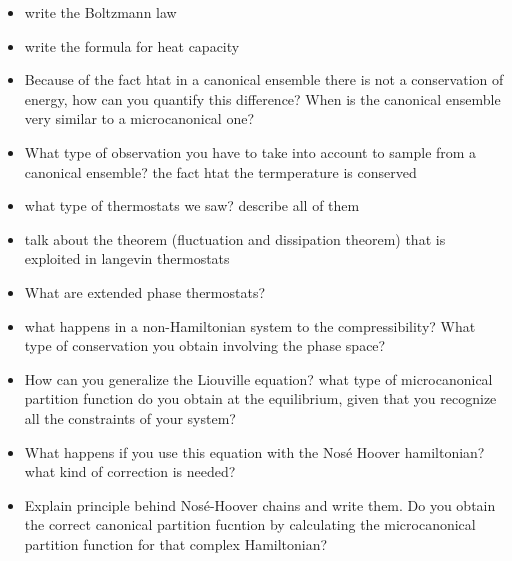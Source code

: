 \begin{enumerate}
\begin{itemize}
        \item write the Boltzmann law
        \item write the formula for heat capacity
        \item Because of the fact htat in a canonical ensemble there is not a conservation of energy, how can you quantify this difference? When is the canonical ensemble very similar to a microcanonical one?
        \item What type of observation you have to take into account to sample from a canonical ensemble? the fact htat the termperature is conserved
        \item what type of thermostats we saw? describe all of them
        \item talk about the theorem (fluctuation and dissipation theorem) that is exploited in langevin thermostats
        \item What are extended phase thermostats?
        \item what happens in a non-Hamiltonian system to the compressibility? What type of conservation you obtain involving the phase space?
        \item How can you generalize the Liouville equation? what type of microcanonical partition function do you obtain at the equilibrium, given that you recognize all the constraints of your system?
        \item What happens if you use this equation with the Nosé Hoover hamiltonian? what kind of correction is needed?
        \item Explain principle behind Nosé-Hoover chains and write them. Do you obtain the correct canonical partition fucntion by calculating the microcanonical partition function for that complex Hamiltonian?
    \end{itemize}

\end{enumerate}
